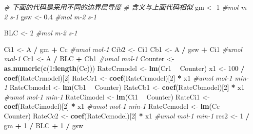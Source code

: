 \documentclass[
]{krantz}
\makeatletter
\newenvironment{Shaded}{\begin{snugshade}}{\end{snugshade}}
\newcommand{\CommentTok}[1]{\textcolor[rgb]{0.56,0.35,0.01}{\textit{#1}}}
\newcommand{\DecValTok}[1]{\textcolor[rgb]{0.00,0.00,0.81}{#1}}
\newcommand{\FloatTok}[1]{\textcolor[rgb]{0.00,0.00,0.81}{#1}}
\newcommand{\KeywordTok}[1]{\textcolor[rgb]{0.13,0.29,0.53}{\textbf{#1}}}
\newcommand{\NormalTok}[1]{#1}
\newcommand{\OperatorTok}[1]{\textcolor[rgb]{0.81,0.36,0.00}{\textbf{#1}}}
\newcommand{\StringTok}[1]{\textcolor[rgb]{0.31,0.60,0.02}{#1}}
\newenvironment{kframe}{%
\medskip{}
\setlength{\fboxsep}{.8em}
 \def\at@end@of@kframe{}%
 \ifinner\ifhmode%
  \def\at@end@of@kframe{\end{minipage}}%
  \begin{minipage}{\columnwidth}%
 \fi\fi%
 \def\FrameCommand##1{\hskip\@totalleftmargin \hskip-\fboxsep
 \colorbox{shadecolor}{##1}\hskip-\fboxsep
     \hskip-\linewidth \hskip-\@totalleftmargin \hskip\columnwidth}%
 \MakeFramed {\advance\hsize-\width
   \@totalleftmargin\z@ \linewidth\hsize
   \@setminipage}}%
 {\par\unskip\endMakeFramed%
 \at@end@of@kframe}
\renewenvironment{Shaded}{\begin{kframe}}{\end{kframe}}
\makeatother
\begin{document}
\begin{Shaded}
\begin{Highlighting}[]
\CommentTok{# 下面的代码是采用不同的边界层导度}
\CommentTok{# 含义与上面代码相似}
\NormalTok{gm <-}\StringTok{ }\DecValTok{1} \CommentTok{#mol m-2 s-1}
\NormalTok{gsw <-}\StringTok{ }\FloatTok{0.4} \CommentTok{#mol m-2 s-1}

\NormalTok{BLC <-}\StringTok{ }\DecValTok{2} \CommentTok{#mol m-2 s-1}

\NormalTok{Ci1 <-}\StringTok{ }\NormalTok{A }\OperatorTok{/}\StringTok{ }\NormalTok{gm }\OperatorTok{+}\StringTok{ }\NormalTok{Cc }\CommentTok{#umol mol-1}
\NormalTok{Cib2 <-}\StringTok{ }\NormalTok{Ci1}
\NormalTok{Cb1 <-}\StringTok{ }\NormalTok{A }\OperatorTok{/}\StringTok{ }\NormalTok{gsw }\OperatorTok{+}\StringTok{ }\NormalTok{Ci1 }\CommentTok{#umol mol-1}
\NormalTok{Cr1 <-}\StringTok{ }\NormalTok{A }\OperatorTok{/}\StringTok{ }\NormalTok{BLC }\OperatorTok{+}\StringTok{ }\NormalTok{Cb1 }\CommentTok{#umol mol-1}
\NormalTok{Counter <-}\StringTok{ }\KeywordTok{as.numeric}\NormalTok{(}\KeywordTok{c}\NormalTok{(}\DecValTok{1}\OperatorTok{:}\KeywordTok{length}\NormalTok{(Cc)))}
\NormalTok{RateCrmodel <-}\StringTok{ }\KeywordTok{lm}\NormalTok{(Cr1 }\OperatorTok{~}\StringTok{ }\NormalTok{Counter)}
\NormalTok{x1 <-}\StringTok{ }\DecValTok{100} \OperatorTok{/}\StringTok{ }\KeywordTok{coef}\NormalTok{(RateCrmodel)[}\DecValTok{2}\NormalTok{]}
\NormalTok{RateCr1 <-}\StringTok{ }\KeywordTok{coef}\NormalTok{(RateCrmodel)[}\DecValTok{2}\NormalTok{] }\OperatorTok{*}\StringTok{ }\NormalTok{x1 }\CommentTok{#umol mol-1 min-1}
\NormalTok{RateCbmodel <-}\StringTok{ }\KeywordTok{lm}\NormalTok{(Cb1 }\OperatorTok{~}\StringTok{ }\NormalTok{Counter)}
\NormalTok{RateCb1 <-}\StringTok{ }\KeywordTok{coef}\NormalTok{(RateCbmodel)[}\DecValTok{2}\NormalTok{] }\OperatorTok{*}\StringTok{ }\NormalTok{x1 }\CommentTok{#umol mol-1 min-1}
\NormalTok{RateCimodel <-}\StringTok{ }\KeywordTok{lm}\NormalTok{(Ci1 }\OperatorTok{~}\StringTok{ }\NormalTok{Counter)}
\NormalTok{RateCi1 <-}\StringTok{ }\KeywordTok{coef}\NormalTok{(RateCimodel)[}\DecValTok{2}\NormalTok{] }\OperatorTok{*}\StringTok{ }\NormalTok{x1 }\CommentTok{#umol mol-1 min-1}
\NormalTok{RateCcmodel <-}\StringTok{ }\KeywordTok{lm}\NormalTok{(Cc }\OperatorTok{~}\StringTok{ }\NormalTok{Counter)}
\NormalTok{RateCc2 <-}\StringTok{ }\KeywordTok{coef}\NormalTok{(RateCcmodel)[}\DecValTok{2}\NormalTok{] }\OperatorTok{*}\StringTok{ }\NormalTok{x1 }\CommentTok{#umol mol-1 min-1}
\NormalTok{res2 <-}\StringTok{ }\DecValTok{1} \OperatorTok{/}\StringTok{ }\NormalTok{gm }\OperatorTok{+}\StringTok{ }\DecValTok{1} \OperatorTok{/}\StringTok{ }\NormalTok{BLC }\OperatorTok{+}\StringTok{ }\DecValTok{1} \OperatorTok{/}\StringTok{ }\NormalTok{gsw}


\end{Highlighting}
\end{Shaded}
\end{document}
